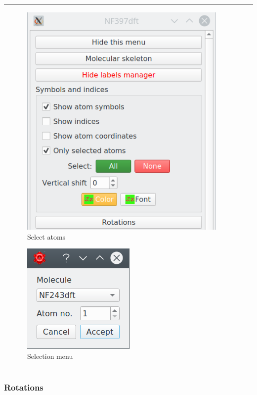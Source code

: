 \documentclass[10pt]{article}
\begin{document}
\begin{tabular}{lcr}
\begin{minipage}{.3\linewidth}
\begin{figure}[H]
\begin{center}
        \includegraphics[width=0.8\linewidth]{damqt320_labels_selected.png}
    \end{center}
    \vspace*{-2mm}
    \caption{Select atoms \label{fig:4_13_2_2}}
\end{figure}
\begin{figure}[H]
    \begin{center}
        \vspace*{-6mm}
        \includegraphics[width=0.4\linewidth]{damqt320_toggle_selection.png}
    \end{center}
    \caption{Selection menu \label{fig:4_13_2_3}}
\end{figure}
\end{minipage}
\end{tabular}


\subsubsection{Rotations \label{sec:4.13.3}}
\end{document}
